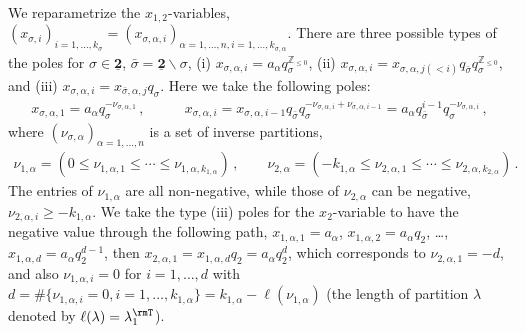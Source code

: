 We reparametrize the $x_{1,2}$-variables, $(x_{\sigma,i})_{i=1,\ldots,k_\sigma} = (x_{\sigma,\alpha,i})_{\alpha=1,\ldots,n,i=1,\ldots,k_{\sigma,\alpha}}$.
There are three possible types of the poles for $\sigma \in \underline{\mathbf{2}}$, $\bar{\sigma} = \underline{\mathbf{2}} \backslash \sigma$, (i) $x_{\sigma,\alpha,i} = a_\alpha q_{\sigma}^{\mathbb{Z}_{\le 0}}$, (ii) $x_{\sigma,\alpha,i} = x_{\sigma,\alpha,j (< i)} q_{\bar{\sigma}} q_\sigma^{\mathbb{Z}_{\le 0}}$, and (iii) $x_{\sigma,\alpha,i} = x_{\bar{\sigma},\alpha,j} q_\sigma$.
Here we take the following poles:
\begin{align}
    x_{\sigma,\alpha,1} = a_\alpha q_{\sigma}^{-\nu_{\sigma,\alpha,1}} 
    \, , \qquad &
    x_{\sigma,\alpha,i} = x_{\sigma,\alpha,i-1} q_{\bar\sigma} q_\sigma^{-\nu_{\sigma,\alpha,i} + \nu_{\sigma,\alpha,i-1}} = a_\alpha q_{\bar\sigma}^{i-1} q_\sigma^{-\nu_{\sigma,\alpha,i}}
    \, ,
\end{align}
where $(\nu_{\sigma,\alpha})_{\alpha = 1,\ldots,n}$ is a set of inverse partitions,
\begin{align}
    \nu_{1,\alpha} = (0 \le \nu_{1,\alpha,1} \le \cdots \le \nu_{1,\alpha,k_{1,\alpha}})
    \, , \qquad 
    \nu_{2,\alpha} = (-k_{1,\alpha} \le \nu_{2,\alpha,1} \le \cdots \le \nu_{2,\alpha,k_{2,\alpha}})
    \, .
\end{align}
The entries of $\nu_{1,\alpha}$ are all non-negative, while those of $\nu_{2,\alpha}$ can be negative, $\nu_{2,\alpha,i} \ge - k_{1,\alpha}$. 
We take the type (iii) poles for the $x_2$-variable to have the negative value through the following path, $x_{1,\alpha,1} = a_\alpha$, $x_{1,\alpha,2} = a_\alpha q_2$, \ldots, $x_{1,\alpha,d} = a_\alpha q_2^{d-1}$, then $x_{2,\alpha,1} = x_{1,\alpha,d} q_2 = a_\alpha q_2^{d}$, which corresponds to $\nu_{2,\alpha,1} = -d$, and also $\nu_{1,\alpha,i} = 0$ for $i = 1,\ldots, d$ with $d = \#\{ \nu_{1,\alpha,i} = 0, i = 1,\ldots,k_{1,\alpha} \} = k_{1,\alpha} - \ell(\nu_{1,\alpha})$ (the length of partition $\lambda$ denoted by $\ell(\lambda) = \lambda_1^\rmT$).
